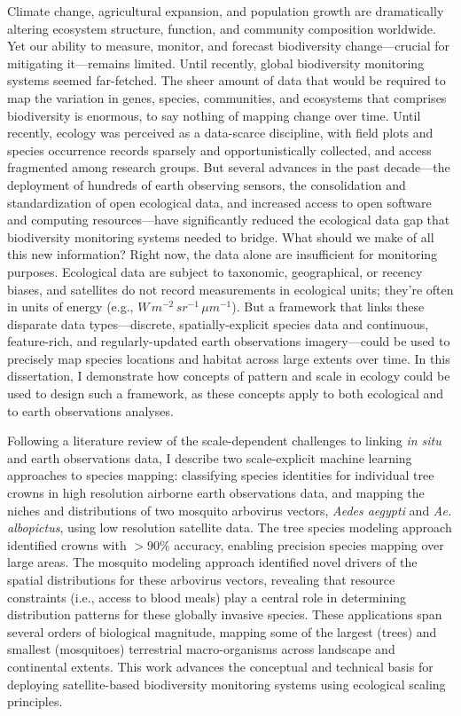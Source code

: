 
Climate change, agricultural expansion, and population growth are dramatically altering ecosystem structure, function, and community composition worldwide. Yet our ability to measure, monitor, and forecast biodiversity change—crucial for mitigating it—remains limited. Until recently, global biodiversity monitoring systems seemed far-fetched. The sheer amount of data that would be required to map the variation in genes, species, communities, and ecosystems that comprises biodiversity is enormous, to say nothing of mapping change over time. Until recently, ecology was perceived as a data-scarce discipline, with field plots and species occurrence records sparsely and opportunistically collected, and access fragmented among research groups. But several advances in the past decade—the deployment of hundreds of earth observing sensors, the consolidation and standardization of open ecological data, and increased access to open software and computing resources—have significantly reduced the ecological data gap that biodiversity monitoring systems needed to bridge. What should we make of all this new information? Right now, the data alone are insufficient for monitoring purposes. Ecological data are subject to taxonomic, geographical, or recency biases, and satellites do not record measurements in ecological units; they're often in units of energy (e.g., $W\, m^{-2}\, sr^{-1}\, {\mu}m^{-1}$). But a framework that links these disparate data types—discrete, spatially-explicit species data and continuous, feature-rich, and regularly-updated earth observations imagery—could be used to precisely map species locations and habitat across large extents over time. In this dissertation, I demonstrate how concepts of pattern and scale in ecology could be used to design such a framework, as these concepts apply to both ecological and to earth observations analyses.

Following a literature review of the scale-dependent challenges to linking \textit{in situ} and earth observations data, I describe two scale-explicit machine learning approaches to species mapping: classifying species identities for individual tree crowns in high resolution airborne earth observations data, and mapping the niches and distributions of two mosquito arbovirus vectors, \textit{Aedes aegypti} and \textit{Ae. albopictus}, using low resolution satellite data. The tree species modeling approach identified crowns with $>90\%$ accuracy, enabling precision species mapping over large areas. The mosquito modeling approach identified novel drivers of the spatial distributions for these arbovirus vectors, revealing that resource constraints (i.e., access to blood meals) play a central role in determining distribution patterns for these globally invasive species. These applications span several orders of biological magnitude, mapping some of the largest (trees) and smallest (mosquitoes) terrestrial macro-organisms across landscape and continental extents. This work advances the conceptual and technical basis for deploying satellite-based biodiversity monitoring systems using ecological scaling principles.